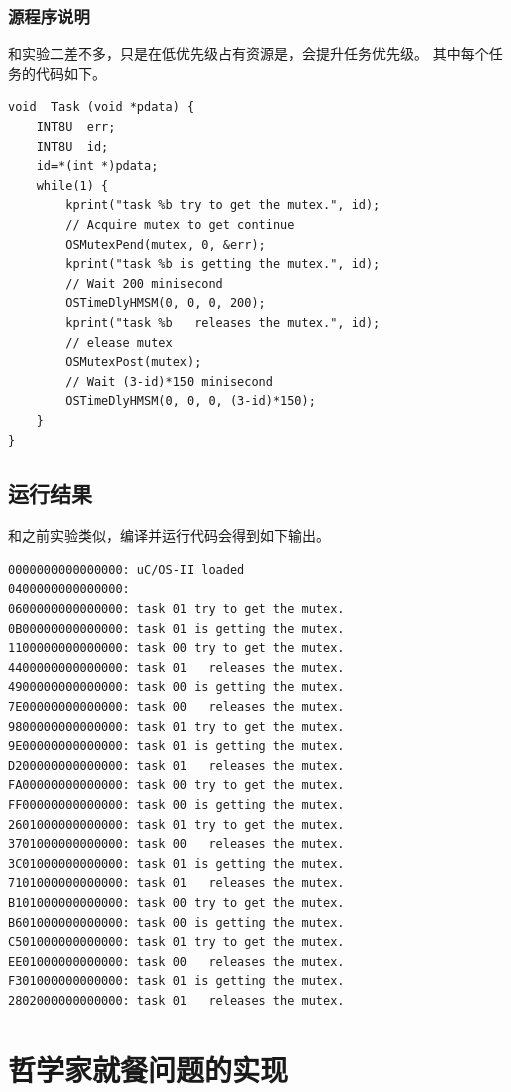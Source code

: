 \documentclass{ctexart}
\begin{document}
    \subsubsection{源程序说明}
    
    和实验二差不多，只是在低优先级占有资源是，会提升任务优先级。
    其中每个任务的代码如下。
    \begin{lstlisting}
void  Task (void *pdata) {
    INT8U  err;
    INT8U  id;
    id=*(int *)pdata;
    while(1) {
        kprint("task %b try to get the mutex.", id);
        // Acquire mutex to get continue
        OSMutexPend(mutex, 0, &err);
        kprint("task %b is getting the mutex.", id);
        // Wait 200 minisecond 
        OSTimeDlyHMSM(0, 0, 0, 200);
        kprint("task %b   releases the mutex.", id);
        // elease mutex
        OSMutexPost(mutex); 
        // Wait (3-id)*150 minisecond
        OSTimeDlyHMSM(0, 0, 0, (3-id)*150);
    }
}
    \end{lstlisting}

    \subsection{运行结果}
    
    和之前实验类似，编译并运行代码会得到如下输出。
    \begin{lstlisting}[language={}]
0000000000000000: uC/OS-II loaded
0400000000000000:
0600000000000000: task 01 try to get the mutex.
0B00000000000000: task 01 is getting the mutex.
1100000000000000: task 00 try to get the mutex.
4400000000000000: task 01   releases the mutex.
4900000000000000: task 00 is getting the mutex.
7E00000000000000: task 00   releases the mutex.
9800000000000000: task 01 try to get the mutex.
9E00000000000000: task 01 is getting the mutex.
D200000000000000: task 01   releases the mutex.
FA00000000000000: task 00 try to get the mutex.
FF00000000000000: task 00 is getting the mutex.
2601000000000000: task 01 try to get the mutex.
3701000000000000: task 00   releases the mutex.
3C01000000000000: task 01 is getting the mutex.
7101000000000000: task 01   releases the mutex.
B101000000000000: task 00 try to get the mutex.
B601000000000000: task 00 is getting the mutex.
C501000000000000: task 01 try to get the mutex.
EE01000000000000: task 00   releases the mutex.
F301000000000000: task 01 is getting the mutex.
2802000000000000: task 01   releases the mutex.
    \end{lstlisting}
    
    \section{哲学家就餐问题的实现}
    
\end{document}
